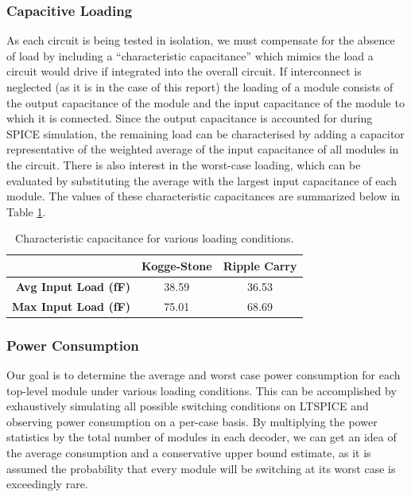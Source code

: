 \documentclass[conference]{IEEEtran}
\begin{document}
\subsubsection{Capacitive Loading}
As each circuit is being tested in isolation, we must compensate for the absence of load by including a “characteristic capacitance” which mimics the load a circuit would drive if integrated into the overall circuit. If interconnect is neglected (as it is in the case of this report) the loading of a module consists of the output capacitance of the module and the input capacitance of the module to which it is connected. Since the output capacitance is accounted for during SPICE simulation, the remaining load can be characterised by adding a capacitor representative of the weighted average of the input capacitance of all modules in the circuit. There is also interest in the worst-case loading, which can be evaluated by substituting the average with the largest input capacitance of each module. The values of these characteristic capacitances are summarized below in Table \ref{tab:capacitance}.

\FloatBarrier
\begin{table}[H]
\centering
\caption{Characteristic capacitance for various loading conditions.}
\label{tab:capacitance}
    \begin{tabular}{r|cc|}
    \cline{2-3}
    \multicolumn{1}{l|}{\cellcolor[HTML]{9B9B9B}{\color[HTML]{9B9B9B} }} & \multicolumn{1}{l|}{\textbf{Kogge-Stone}} & \multicolumn{1}{l|}{\textbf{Ripple Carry}} \\ \hline
    \multicolumn{1}{|r|}{\textbf{Avg Input Load (fF)}}                   & 38.59                                     & 36.53                                      \\ \cline{1-1}
    \multicolumn{1}{|r|}{\textbf{Max Input Load (fF)}}                   & 75.01                                     & 68.69                                      \\ \hline
    \end{tabular}
\end{table}
\FloatBarrier

\subsubsection{Power Consumption}


Our goal is to determine the average and worst case power consumption for each top-level module under various loading conditions. This can be accomplished by exhaustively simulating all possible switching conditions on LTSPICE and observing power consumption on a per-case basis. By multiplying the power statistics by the total number of modules in each decoder, we can get an idea of the average consumption and a conservative upper bound estimate, as it is assumed the probability that every module will be switching at its worst case is exceedingly rare.
\end{document}

